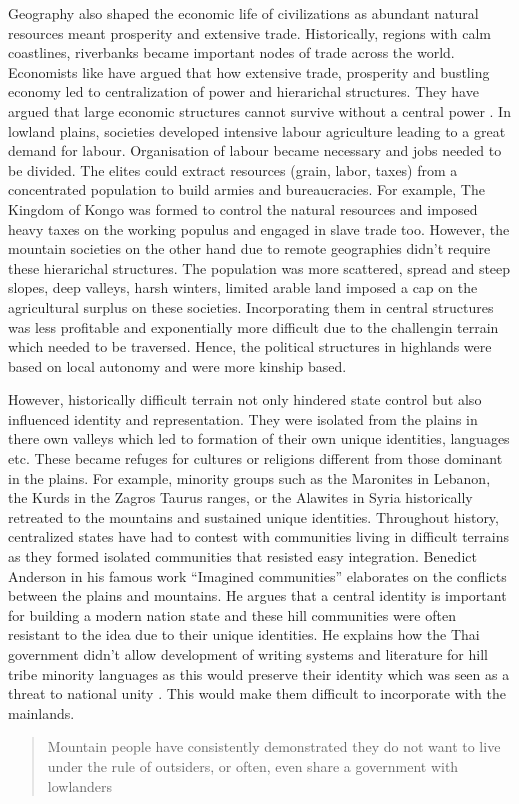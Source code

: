 Geography also shaped the economic life of civilizations as abundant natural resources meant prosperity and extensive trade. Historically, regions with calm coastlines, riverbanks became important nodes of trade across the world. Economists like \cite{smith1937wealth} have argued that how extensive trade, prosperity and bustling economy led to centralization of power and hierarichal structures. They have argued that large economic structures cannot survive without a central power \citep{robinson2012nations}. In lowland plains, societies developed intensive labour agriculture leading to a great demand for labour. Organisation of labour became necessary and jobs needed to be divided. The elites could extract resources (grain, labor, taxes) from a concentrated population to build armies and bureaucracies. For example, The Kingdom of Kongo was formed to control the natural resources and imposed heavy taxes on the working populus and engaged in slave trade too. However, the mountain societies on the other hand due to remote geographies didn't require these hierarichal structures. The population was more scattered, spread and  steep slopes, deep valleys, harsh winters, limited arable land imposed a cap on the agricultural surplus on these societies. Incorporating them in central structures was less profitable and exponentially more difficult due to the challengin terrain which needed to be traversed. Hence, the political structures in highlands were based on local autonomy and were more kinship based.

\vspace{0.3cm}

However, historically difficult terrain not only hindered state control but also influenced identity and representation. They were isolated from the plains in there own valleys which led to formation of their own unique identities, languages etc. These became refuges for cultures or religions different from those dominant in the plains. For example, minority groups such as the Maronites in Lebanon, the Kurds in the Zagros Taurus ranges, or the Alawites in Syria historically retreated to the mountains and sustained unique identities.
 Throughout history, centralized states have had to contest with communities living in difficult terrains as they formed isolated communities that resisted easy integration. Benedict Anderson in his famous work ``Imagined communities'' elaborates on the conflicts between the plains and mountains. He argues that a central identity is important for building a modern nation state and these hill communities were often resistant to the idea due to their unique identities. He explains how the Thai government didn't allow development of writing systems and literature for hill tribe minority languages as this would preserve their identity which was seen as a threat to national unity \citep{anderson1991imagined}. This would make them difficult to incorporate with the mainlands.  \begin{quote} Mountain people have consistently demonstrated they do not want to live under the rule of outsiders, or often, even share a government with lowlanders\end{quote} 

